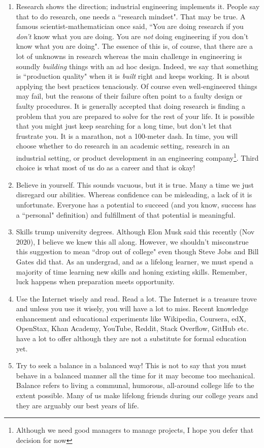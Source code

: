\documentclass[a6paper]{article}
\begin{document}
\begin{enumerate}
    \item Research shows the direction; industrial engineering implements it. People say that to do research, one needs a ``research mindset". That may be true. A famous scientist-mathematician \cite{hamming} once said, ``You are doing research if you \emph{don't} know what you are doing. You are \emph{not} doing engineering if you don't know what you are doing". The essence of this is, of course, that there are a lot of unknowns in research whereas the main challenge in engineering is soundly \emph{building} things with an ad hoc design. Indeed, we say that something is ``production quality" when it is \emph{built} right and keeps working. It is about applying the best practices tenaciously. Of course even well-engineered things may fail, but the reasons of their failure often point to a faulty design or faulty procedures.  It is generally accepted that doing research is finding a problem that you are prepared to solve for the rest of your life. It is possible that you might just keep searching for a long time, but don't let that frustrate you. It is a marathon, not a 100-meter dash. In time, you will choose whether to do research in an academic setting, research in an industrial setting, or product development in an engineering company\footnote{Although we need good managers to manage projects, I hope you defer that decision for now}. Third choice is what most of us do as a career and that is okay!
    \item Believe in yourself. This sounds vacuous, but it is true. Many a time we just disregard our abilities. Whereas confidence can be misleading, a lack of it is unfortunate. Everyone has a potential to succeed (and you know, success has a ``personal" definition) and fulfillment of that potential is meaningful. 
    \item Skills trump university degrees. Although Elon Musk said this recently (Nov 2020), I believe we knew this all along. However, we shouldn't misconstrue this suggestion to mean ``drop out of college" even though Steve Jobs and Bill Gates did that. As an undergrad, and as a lifelong learner, we must spend a majority of time learning new skills and honing existing skills. Remember, luck happens when preparation meets opportunity.
    \item Use the Internet wisely and read. Read a lot. The Internet is a treasure trove and unless you use it wisely, you will have a lot to miss. Recent knowledge enhancement and educational experiments like Wikipedia, Coursera, edX, OpenStax, Khan Academy, YouTube, Reddit, Stack Overflow, GitHub etc. have a lot to offer although they are not a substitute for formal education yet.
    \item Try to seek a balance in a balanced way! This is not to say that you must behave in a balanced manner all the time for it may become too mechanical. Balance refers to living a communal, humorous, all-around college life to the extent possible. Many of us make lifelong friends during our college years and they are arguably our best years of life. 
\end{enumerate}
\end{document}
